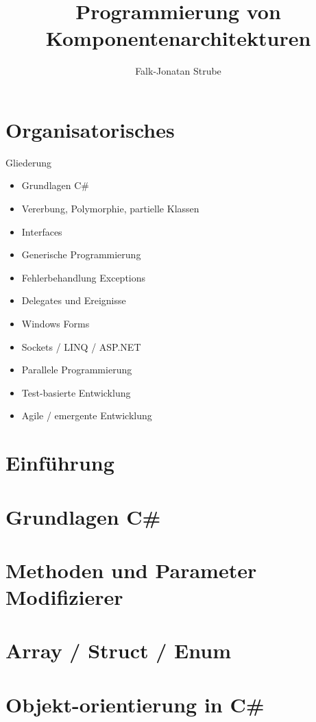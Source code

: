\documentclass{scrreprt}
\title{Programmierung von Komponentenarchitekturen}
\author{Falk-Jonatan Strube}
\begin{document}
\maketitle
\tableofcontents

\chapter*{Organisatorisches}
Gliederung
\begin{itemize}
\item Grundlagen C\#
\item Vererbung, Polymorphie, partielle Klassen
\item Interfaces
\item Generische Programmierung
\item Fehlerbehandlung Exceptions
\item Delegates und Ereignisse
\item Windows Forms
\item Sockets / LINQ / ASP.NET
\item Parallele Programmierung
\item Test-basierte Entwicklung
\item Agile / emergente Entwicklung 
\end{itemize}

\chapter{Einführung}


\chapter{Grundlagen C\#}


\chapter{Methoden und Parameter Modifizierer}


\chapter{Array / Struct / Enum}

 
\chapter{Objekt-orientierung in C\#}

\end{document}
